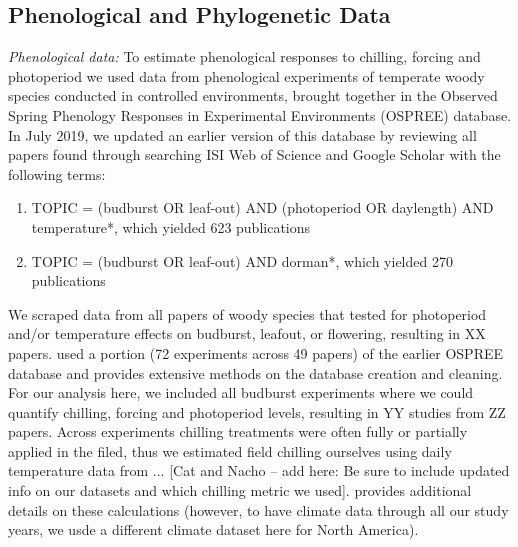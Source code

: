 \documentclass{article}\usepackage[]{graphicx}\usepackage[]{color}
\begin{document}
\subsection*{Phenological and Phylogenetic Data}
\emph{Phenological data:} To estimate phenological responses to chilling, forcing and photoperiod we used data from phenological experiments of temperate woody species conducted in controlled environments, brought together in the Observed Spring Phenology Responses in Experimental Environments (OSPREE) database. In July 2019, we updated an earlier version of this database \citep{wolkovich2019} by reviewing all papers found through searching ISI Web of Science and Google Scholar with the following terms: 
\begin{enumerate}
\item TOPIC = (budburst OR leaf-out) AND (photoperiod OR daylength) AND temperature*, which yielded 623 publications
\item TOPIC = (budburst OR leaf-out) AND dorman*, which yielded 270 publications
\end{enumerate}
We scraped data from all papers of woody species that tested for photoperiod and/or temperature effects on budburst, leafout, or flowering, resulting in XX papers. \citet{ospreebbms} used a portion (72 experiments across 49 papers) of the earlier OSPREE database and provides extensive methods on the database creation and cleaning. For our analysis here, we included all budburst experiments where we could quantify chilling, forcing and photoperiod levels, resulting in YY studies from ZZ papers. 
Across experiments chilling treatments were often fully or partially applied in the filed, thus we estimated field chilling ourselves using daily temperature data from ... [Cat and Nacho -- add here: Be sure to include updated info on our datasets and which chilling metric we used]. \citet{ospreebbms} provides additional details on these calculations (however, to have climate data through all our study years, we usde a different climate dataset here for North America). 
\end{document}
